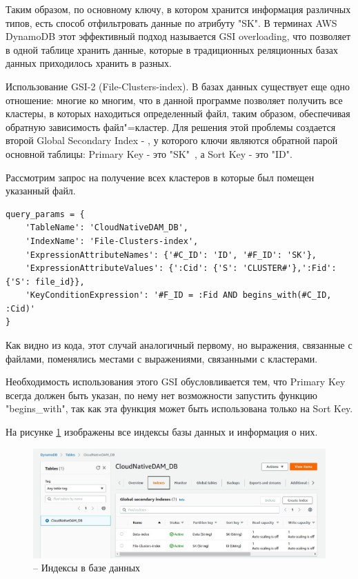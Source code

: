 Таким образом, по основному ключу, в котором хранится информация различных типов, есть способ отфильтровать данные по атрибуту "SK". В терминах AWS DynamoDB этот эффективный подход называется GSI overloading, что позволяет в одной таблице хранить данные, которые в традиционных реляционных базах данных приходилось хранить в разных.

Использование GSI-2 (File-Clusters-index). В базах данных существует еще одно отношение: многие ко многим, что в данной программе позволяет получить все кластеры, в которых находиться определенный файл, таким образом, обеспечивая обратную зависимость файл"=кластер. Для решения этой проблемы создается второй Global Secondary Index - , у которого ключи являются обратной парой основной таблицы: Primary Key - это "SK"\ , а Sort Key - это "ID".

\clearpage

Рассмотрим запрос на получение всех кластеров в которые был помещен указанный файл.
\begin{lstlisting}
query_params = {
    'TableName': 'CloudNativeDAM_DB',
    'IndexName': 'File-Clusters-index',
    'ExpressionAttributeNames': {'#C_ID': 'ID', '#F_ID': 'SK'},
    'ExpressionAttributeValues': {':Cid': {'S': 'CLUSTER#'},':Fid': {'S': file_id}},
    'KeyConditionExpression': '#F_ID = :Fid AND begins_with(#C_ID, :Cid)'
}
\end{lstlisting}

Как видно из кода, этот случай аналогичный первому, но выражения, связанные с файлами, поменялись местами с выражениями, связанными с кластерами.

Необходимость использования этого GSI обусловливается тем, что Primary Key всегда должен быть указан, по нему нет возможности запустить функцию "begins\_with", так как эта функция может быть использована только на Sort Key.

На рисунке \ref{gsis} изображены все индексы базы данных и информация о них.
\begin{figure}[H]
    \centering
    \includegraphics[scale=0.65]{images/gsis.jpg}
    \caption{-- Индексы в базе данных}
    \label{gsis}
\end{figure}

